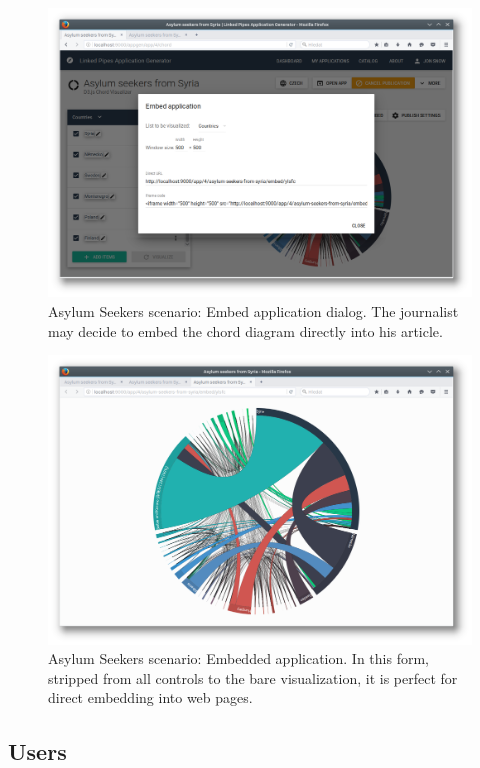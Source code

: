 \begin{figure}
	\centering
	\includegraphics[width=145mm]{img/05_scenario_10_embed_application}
	\caption{Asylum Seekers scenario: Embed application dialog. The journalist may decide to embed the chord diagram directly into his article.}
    \label{fig:scenario-10-embed-application}
\end{figure}
\begin{figure}
	\centering
	\includegraphics[width=145mm]{img/05_scenario_11_embedded_application}
	\caption{Asylum Seekers scenario: Embedded application. In this form, stripped from all controls to the bare visualization, it is perfect for direct embedding into web pages.}
    \label{fig:scenario-11-embedded-application}
\end{figure}


\subsection{Users}
\label{sec:implementation:overview:users}

